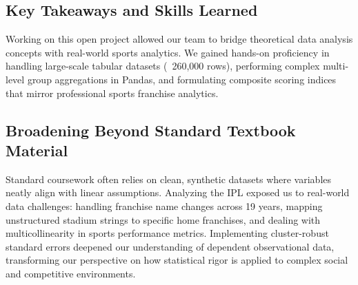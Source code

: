 \documentclass[11pt,a4paper]{article}
\begin{document}
\subsection*{Key Takeaways and Skills Learned}
Working on this open project allowed our team to bridge theoretical data analysis concepts with real-world sports analytics. We gained hands-on proficiency in handling large-scale tabular datasets (~260,000 rows), performing complex multi-level group aggregations in Pandas, and formulating composite scoring indices that mirror professional sports franchise analytics. 

\subsection*{Broadening Beyond Standard Textbook Material}
Standard coursework often relies on clean, synthetic datasets where variables neatly align with linear assumptions. Analyzing the IPL exposed us to real-world data challenges: handling franchise name changes across 19 years, mapping unstructured stadium strings to specific home franchises, and dealing with multicollinearity in sports performance metrics. Implementing cluster-robust standard errors deepened our understanding of dependent observational data, transforming our perspective on how statistical rigor is applied to complex social and competitive environments.
\end{document}
